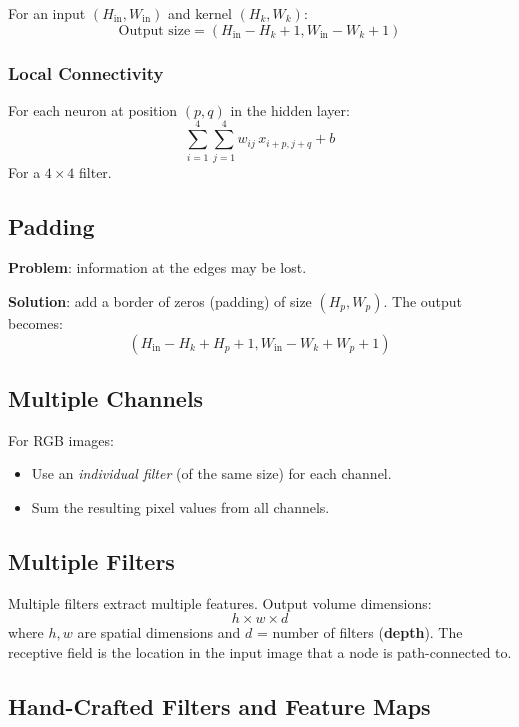 \documentclass[11pt,a4paper]{article}
\begin{document}
For an input $(H_{\text{in}}, W_{\text{in}})$ and kernel $(H_k, W_k)$:
\[
\text{Output size} = (H_{\text{in}} - H_k + 1, W_{\text{in}} - W_k + 1)
\]

\subsubsection{Local Connectivity}

For each neuron at position $(p, q)$ in the hidden layer:
\[
\sum_{i=1}^{4}\sum_{j=1}^{4} w_{ij}\, x_{i+p, j+q} + b
\]
For a $4 \times 4$ filter.

\subsection{Padding}

\textbf{Problem}: information at the edges may be lost.

\textbf{Solution}: add a border of zeros (padding) of size $(H_p, W_p)$. The output becomes:
\[
(H_{\text{in}} - H_k + H_p + 1, W_{\text{in}} - W_k + W_p + 1)
\]

\subsection{Multiple Channels}

For RGB images:
\begin{itemize}[leftmargin=*]
    \item Use an \emph{individual filter} (of the same size) for each channel.
    \item Sum the resulting pixel values from all channels.
\end{itemize}

\subsection{Multiple Filters}

Multiple filters extract multiple features. Output volume dimensions:
\[
h \times w \times d
\]
where $h, w$ are spatial dimensions and $d$ = number of filters (\textbf{depth}). The receptive field is the location in the input image that a node is path-connected to.

\subsection{Hand-Crafted Filters and Feature Maps}
\end{document}

